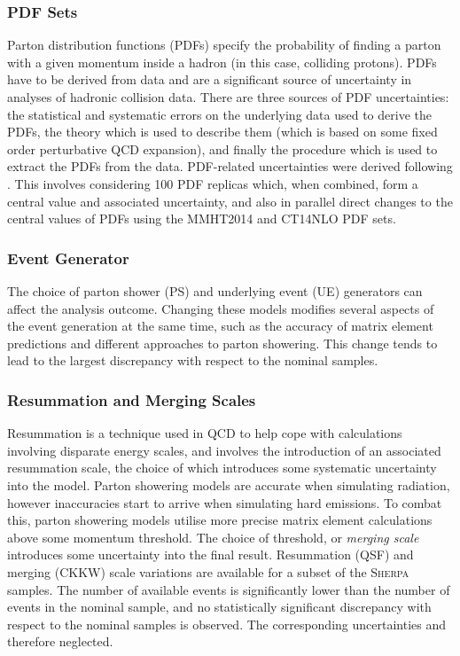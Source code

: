 \subsubsection{PDF Sets}

Parton distribution functions (PDFs) specify the probability of finding a parton with a given momentum inside a hadron (in this case, colliding protons).
PDFs have to be derived from data and are a significant source of uncertainty in analyses of hadronic collision data.
There are three sources of PDF uncertainties: the statistical and systematic errors on the underlying data used to derive the PDFs, the theory which is used to describe them (which is based on some fixed order perturbative QCD expansion), and finally the procedure which is used to extract the PDFs from the data. 
PDF-related uncertainties were derived following .
This involves considering 100 PDF replicas which, when combined, form a central value and associated uncertainty, and also in parallel direct changes to the central values of PDFs using the MMHT2014 \cite{Harland-Lang:2014zoa} and CT14NLO \cite{Dulat:2015mca} PDF sets.

\subsubsection{Event Generator}

The choice of parton shower (PS) and underlying event (UE) generators can affect the analysis outcome.
Changing these models modifies several aspects of the event generation at the same time, such as the accuracy of matrix element predictions and different approaches to parton showering.
This change tends to lead to the largest discrepancy with respect to the nominal samples.

\subsubsection{Resummation and Merging Scales}

Resummation is a technique used in QCD to help cope with calculations involving disparate energy scales, and involves the introduction of an associated resummation scale, the choice of which introduces some systematic uncertainty into the model.
Parton showering models are accurate when simulating \lowpt radiation, however inaccuracies start to arrive when simulating hard emissions.
To combat this, parton showering models utilise more precise matrix element calculations above some momentum threshold.
The choice of threshold, or \textit{merging scale} introduces some uncertainty into the final result.
Resummation (QSF) and merging (CKKW) scale variations are available for a subset of the \textsc{Sherpa} samples.
The number of available events is significantly lower than the number of events in the nominal sample, and no statistically significant discrepancy with respect to the nominal samples is observed.
The corresponding uncertainties and therefore neglected.



